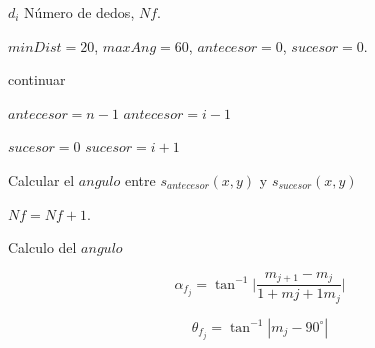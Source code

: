 \begin{algorithm}
\begin{algorithmic}[1]

\REQUIRE $d_i$
\ENSURE Número de dedos, $Nf$.  

	\STATE $minDist=20$, $maxAng=60$, $antecesor=0$, $sucesor=0$. 	
	
	\STATE continuar
	\ENDIF 
	
	\STATE $antecesor=n-1$
	\ELSE
	\STATE $antecesor=i-1$
	\ENDIF 

	\STATE $sucesor=0$
	\ELSE
	\STATE $sucesor=i+1$
	\ENDIF   
	
	\STATE Calcular el $angulo$ entre $s_{antecesor}(x,y)$ y $s_{sucesor}(x,y)$
	
	\RETURN \FALSE
	\ENDIF  
	
	\STATE $Nf=Nf+1$.

\ENDFOR 

Calculo del $angulo$

$$ \alpha_{f_j} = \tan^{-1}{ \bigg| \frac{m_{j+1}-m_j}{1+m{j+1}m_j} \bigg|}$$

$$ \theta_{f_j} = \tan^{-1} | {m_j} - 90^\circ |$$

\end{algorithmic}
\end{algorithm}





 

%


